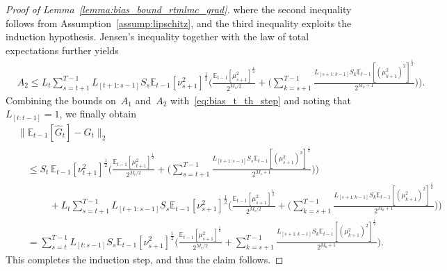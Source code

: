 \documentclass[10pt,a4paper]{amsart}
\newcommand{\EE}{\mathbb{E}}
\begin{document}
\begin{proof}[Proof of Lemma~\ref{lemma:bias_bound_rtmlmc_grad}]
where the second inequality follows from Assumption~\ref{assump:lipschitz}, and the third inequality exploits the induction hypothesis. Jensen’s inequality together with the law of total expectations further yields
\begin{align*}
&A_2 \leq  L_t \sum_{s=t+1}^{T-1}L_{[t+1:s-1]}S_s \EE_{t-1}[\nu_{s+1}^{2}]^\frac{1}{2} \bigg(\frac{\EE_{t-1}[\mu_{s+1}^{2}]^\frac{1}{2} }{2^{M_s/2}} + \bigg(\sum_{k=s+1}^{T-1} \frac{L_{[s+1:k-1]}S_k\EE_{t-1}[(\mu_{k+1}^{2})^2]^\frac{1}{2}}{2^{M_k + 1}}\bigg) \bigg) .
\end{align*}
Combining the bounds on~$A_1$ and~$A_2$ with~\eqref{eq:bias_t_th_step} and noting that $L_{[t:t-1]}=1$, we finally obtain
\begin{align*}
    &\big\| \EE_{t-1}[\hat{G}_t] - G_t\big\|_2\\
    &\quad \leq S_t \, \EE_{t-1}[\nu_{t+1}^{2}]^\frac{1}{2} \bigg(\frac{\EE_{t-1}[\mu_{t+1}^2]^\frac{1}{2}}{2^{M_t/2}} +\bigg(\sum_{s=t+1}^{T-1} \frac{L_{[t+1:s-1]} S_s \EE_{t-1}[(\mu_{s+1}^{2})^2]^\frac{1}{2}}{2^{M_s + 1}}\bigg) \bigg)   \\
    &\qquad\;\quad + L_t \sum_{s=t+1}^{T-1}L_{[t+1:s-1]}S_s \EE_{t-1}[\nu_{s+1}^{2}]^\frac{1}{2}\bigg(\frac{ \EE_{t-1}[\mu_{s+1}^{2}]^\frac{1}{2} }{2^{M_s/2}} + \bigg(\sum_{k=s+1}^{T-1} \frac{L_{[s+1:k-1]}S_k\EE_{t-1}[(\mu_{k+1}^{2})^2]^\frac{1}{2}}{2^{M_k + 1}}\bigg) \bigg)\\
    &\quad = \sum_{s=t}^{T-1} L_{[t:s-1]}S_s \EE_{t-1}[\nu_{s+1}^{2}]^\frac{1}{2} \bigg(\frac{ \EE_{t-1}[\mu_{s+1}^{2}]^\frac{1}{2}}{2^{M_s/2}} 
    + \sum_{k=s+1}^{T-1} \frac{L_{[s+1:k-1]}S_k\EE_{t-1}[(\mu_{k+1}^{2})^2]^\frac{1}{2}}{2^{M_k+1}}\bigg).
\end{align*}
This completes the induction step, and thus the claim follows.
\end{proof}
\end{document}
